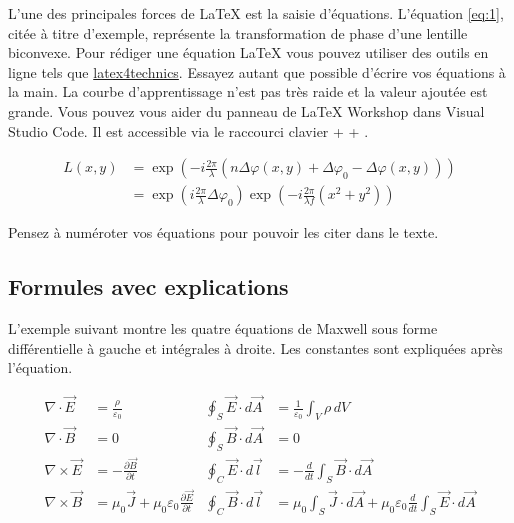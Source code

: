 L'une des principales forces de \LaTeX{} est la saisie d'équations. L'équation \ref{eq:1}, citée à titre d'exemple, représente la transformation de phase d'une lentille biconvexe. Pour rédiger une équation \LaTeX{} vous pouvez utiliser des outils en ligne tels que \href{https://www.latex4technics.com/}{latex4technics}. Essayez autant que possible d'écrire vos équations à la main.
La courbe d'apprentissage n'est pas très raide et la valeur ajoutée est grande. Vous pouvez vous aider du panneau de \LaTeX{} Workshop dans Visual Studio Code. Il est accessible via le raccourci clavier  +  + .

\begin{equation} \label{eq:1}
    \begin{split}
        L(x,y) & = \exp\left( - i\frac{{2\pi }}{\lambda }\left( {n\Delta \varphi (x,y) + \Delta {\varphi _0} - \Delta \varphi (x,y)} \right)\right)      \\
               & = {\exp\left({i\frac{{2\pi }}{\lambda }\Delta {\varphi _0}}\right)}{\exp\left({ - i\frac{{2\pi }}{{\lambda f}}({x^2} + {y^2})}\right)}
    \end{split}
\end{equation}

Pensez à numéroter vos équations pour pouvoir les citer dans le texte.

\subsection{Formules avec explications}

L'exemple suivant montre les quatre équations de Maxwell sous forme différentielle à gauche et intégrales à droite. Les constantes sont expliquées après l'équation.

\begin{subequations}
    \begin{align}
        \nabla \cdot \vec{E}  & = \frac{\rho}{\varepsilon_0}                                              & \oint_{S} \vec{E} \cdot d\vec{A} & = \frac{1}{\varepsilon_0} \int_{V} \rho \, dV                                                              \\[1em]
        \nabla \cdot \vec{B}  & = 0                                                                       & \oint_{S} \vec{B} \cdot d\vec{A} & = 0                                                                                                        \\[1em]
        \nabla \times \vec{E} & = -\frac{\partial \vec{B}}{\partial t}                                    & \oint_{C} \vec{E} \cdot d\vec{l} & = -\frac{d}{dt} \int_{S} \vec{B} \cdot d\vec{A}                                                            \\[1em]
        \nabla \times \vec{B} & = \mu_0 \vec{J} + \mu_0 \varepsilon_0 \frac{\partial \vec{E}}{\partial t} & \oint_{C} \vec{B} \cdot d\vec{l} & = \mu_0 \int_{S} \vec{J} \cdot d\vec{A} + \mu_0 \varepsilon_0 \frac{d}{dt} \int_{S} \vec{E} \cdot d\vec{A}
    \end{align}
\end{subequations}

